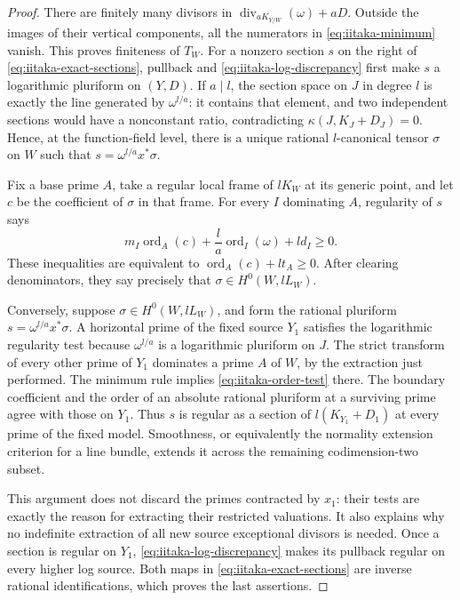 \begin{proof}
There are finitely many divisors in
\(\operatorname{div}_{aK_{Y/W}}(\omega)+aD\).  Outside the images of
their vertical components, all the numerators in
\eqref{eq:iitaka-minimum} vanish.  This proves finiteness of \(T_W\).
For a nonzero section \(s\) on the right of
\eqref{eq:iitaka-exact-sections}, pullback and
\eqref{eq:iitaka-log-discrepancy} first make \(s\) a logarithmic
pluriform on \((Y,D)\).  If \(a\mid l\), the section space on \(J\)
in degree \(l\) is exactly the line generated by \(\omega^{l/a}\):
it contains that element, and two independent sections would have a
nonconstant ratio, contradicting \(\kappa(J,K_J+D_J)=0\).
Hence, at the function-field level, there is a unique rational
\(l\)-canonical tensor \(\sigma\) on \(W\) such that
\(s=\omega^{l/a}x^*\sigma\).

Fix a base prime \(A\), take a regular local frame of \(lK_W\) at its
generic point, and let \(c\) be the coefficient of \(\sigma\) in that
frame.  For every \(I\) dominating \(A\), regularity of \(s\) says
\begin{equation}\label{eq:iitaka-order-test}
 m_I\operatorname{ord}_A(c)
       +\frac la\operatorname{ord}_I(\omega)+l d_I\ge0.
\end{equation}
These inequalities are equivalent to
\(\operatorname{ord}_A(c)+lt_A\ge0\).  After clearing denominators,
they say precisely that \(\sigma\in H^0(W,lL_W)\).

Conversely, suppose \(\sigma\in H^0(W,lL_W)\), and form the rational
pluriform \(s=\omega^{l/a}x^*\sigma\).  A horizontal prime of the fixed
source \(Y_1\) satisfies the logarithmic regularity test because
\(\omega^{l/a}\) is a logarithmic pluriform on \(J\).  The strict
transform of every other prime of \(Y_1\) dominates a prime \(A\) of
\(W\), by the extraction just performed.  The minimum rule implies
\eqref{eq:iitaka-order-test} there.  The boundary coefficient and the
order of an absolute rational pluriform at a surviving prime agree
with those on \(Y_1\).  Thus \(s\) is regular as a section of
\(l(K_{Y_1}+D_1)\) at every prime of the fixed model.  Smoothness, or
equivalently the normality extension criterion for a line bundle,
extends it across the remaining codimension-two subset.

This argument does not discard the primes contracted by \(x_1\): their
tests are exactly the reason for extracting their restricted valuations.
It also explains why no indefinite extraction of all new source
exceptional divisors is needed.  Once a section is regular on \(Y_1\),
\eqref{eq:iitaka-log-discrepancy} makes its pullback regular on every
higher log source.  Both maps in \eqref{eq:iitaka-exact-sections} are
inverse rational identifications, which proves the last assertions.
\end{proof}

